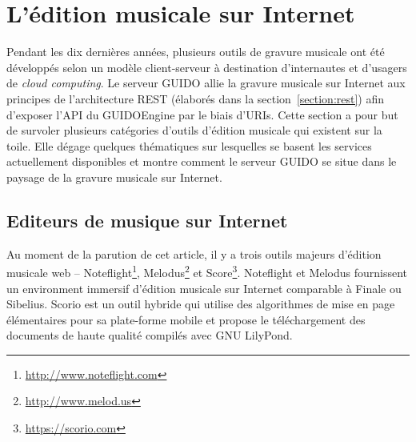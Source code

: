 \documentclass{article}
\begin{document}
\section{L'édition musicale sur Internet}\label{section:online-musical-editing}
Pendant les dix dernières années, plusieurs outils de gravure musicale ont été développés selon un modèle client-serveur à destination d'internautes et d'usagers de \emph{cloud computing}. Le serveur GUIDO allie la gravure musicale sur Internet aux principes de l'architecture REST (élaborés dans la section~\ref{section:rest}) afin d'exposer l'API du GUIDOEngine \cite{guido} par le biais d'URIs. Cette section a pour but de survoler plusieurs catégories d'outils d'édition musicale qui existent sur la toile. Elle dégage quelques thématiques sur lesquelles se basent les services actuellement disponibles et montre comment le serveur GUIDO se situe dans le paysage de la gravure musicale sur Internet.
\subsection{Editeurs de musique sur Internet}\label{subsection:editor}
Au moment de la parution de cet article, il y a trois outils majeurs d'édition musicale web -- Noteflight\footnote{\url{http://www.noteflight.com}}, Melodus\footnote{\url{http://www.melod.us}} et Score\footnote{\url{https://scorio.com}}. Noteflight et Melodus fournissent un environment immersif d'édition musicale sur Internet comparable à Finale ou Sibelius. Scorio est un outil hybride qui utilise des algorithmes de mise en page élémentaires pour sa plate-forme mobile et propose le téléchargement des documents de haute qualité compilés avec GNU LilyPond.
\end{document}

